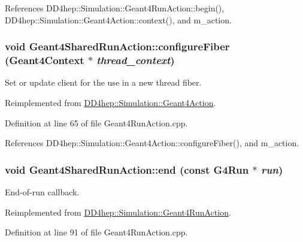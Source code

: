 References DD4hep::Simulation::Geant4RunAction::begin(), DD4hep::Simulation::Geant4Action::context(), and m\_\-action.\hypertarget{class_d_d4hep_1_1_simulation_1_1_geant4_shared_run_action_a6077a3ce7deb655ef76d4fe4e8dc1b19}{
\subsubsection[{configureFiber}]{\setlength{\rightskip}{0pt plus 5cm}void Geant4SharedRunAction::configureFiber ({\bf Geant4Context} $\ast$ {\em thread\_\-context})}}
\label{class_d_d4hep_1_1_simulation_1_1_geant4_shared_run_action_a6077a3ce7deb655ef76d4fe4e8dc1b19}


Set or update client for the use in a new thread fiber. 

Reimplemented from \hyperlink{class_d_d4hep_1_1_simulation_1_1_geant4_action_a6adc7138508303e4e417cb48a737ab19}{DD4hep::Simulation::Geant4Action}.

Definition at line 65 of file Geant4RunAction.cpp.

References DD4hep::Simulation::Geant4Action::configureFiber(), and m\_\-action.\hypertarget{class_d_d4hep_1_1_simulation_1_1_geant4_shared_run_action_af723af818fd7798e910dcfef30092345}{
\subsubsection[{end}]{\setlength{\rightskip}{0pt plus 5cm}void Geant4SharedRunAction::end (const G4Run $\ast$ {\em run})}}
\label{class_d_d4hep_1_1_simulation_1_1_geant4_shared_run_action_af723af818fd7798e910dcfef30092345}


End-\/of-\/run callback. 

Reimplemented from \hyperlink{class_d_d4hep_1_1_simulation_1_1_geant4_run_action_a71c7dbfb3451a9d6cc594f0174a631a2}{DD4hep::Simulation::Geant4RunAction}.

Definition at line 91 of file Geant4RunAction.cpp.

